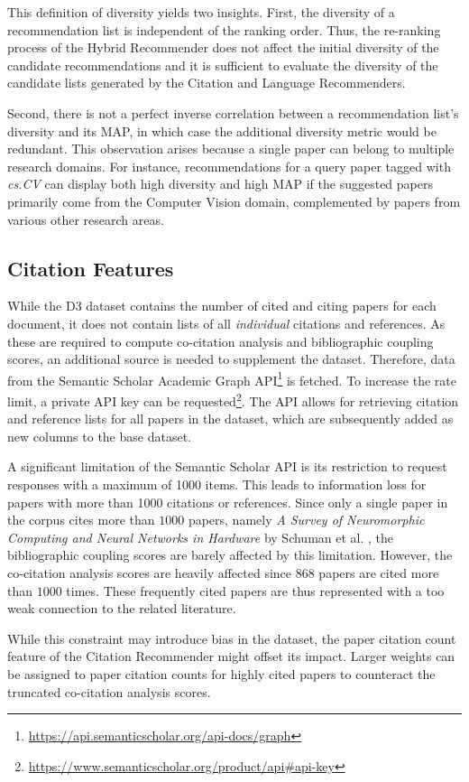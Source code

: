 This definition of diversity yields two insights. First, the diversity of a recommendation list is independent of the ranking order. Thus, the re-ranking process of the Hybrid Recommender does not affect the initial diversity of the candidate recommendations and it is sufficient to evaluate the diversity of the candidate lists generated by the Citation and Language Recommenders.

Second, there is not a perfect inverse correlation between a recommendation list's diversity and its \ac{MAP}, in which case the additional diversity metric would be redundant.
This observation arises because a single paper can belong to multiple research domains. For instance, recommendations for a query paper tagged with \emph{cs.CV} can display both high diversity and high \ac{MAP} if the suggested papers primarily come from the Computer Vision domain, complemented by papers from various other research areas.


\subsection{Citation Features} \label{sec:citation-features}

While the D3 dataset contains the number of cited and citing papers for each document, it does not contain lists of all \emph{individual} citations and references. As these are required to compute co-citation analysis and bibliographic coupling scores, an additional source is needed to supplement the dataset.
Therefore, data from the Semantic Scholar Academic Graph API\footnote{\url{https://api.semanticscholar.org/api-docs/graph}} is fetched.
To increase the rate limit, a private API key can be requested\footnote{\url{https://www.semanticscholar.org/product/api\#api-key}}.
The API allows for retrieving citation and reference lists for all papers in the dataset, which are subsequently added as new columns to the base dataset.

A significant limitation of the Semantic Scholar API is its restriction to request responses with a maximum of 1000 items. This leads to information loss for papers with more than 1000 citations or references.
Since only a single paper in the corpus cites more than $1000$ papers, namely \emph{A Survey of Neuromorphic Computing and Neural Networks in Hardware} by Schuman et al. \cite{SchumanSurveyNeuromorphic2017}, the bibliographic coupling scores are barely affected by this limitation.
However, the co-citation analysis scores are heavily affected since $868$ papers are cited more than $1000$ times.
These frequently cited papers are thus represented with a too weak connection to the related literature.

While this constraint may introduce bias in the dataset, the paper citation count feature of the Citation Recommender might offset its impact.
Larger weights can be assigned to paper citation counts for highly cited papers to counteract the truncated co-citation analysis scores.
